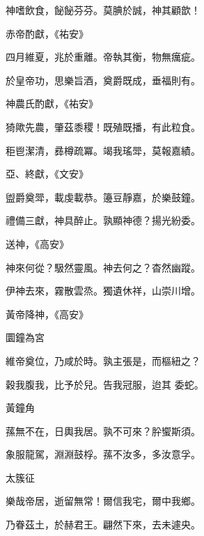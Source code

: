 \begin{pinyinscope}
 神嗜飲食，飶飶芬芬。莫腆於誠，神其顧歆！



 赤帝酌獻，《祐安》



 四月維夏，兆於重離。帝執其衡，物無癘疵。



 於皇帝功，思樂旨酒，奠爵既成，垂福則有。



 神農氏酌獻，《祐安》



 猗歟先農，肇茲黍稷！既殖既播，有此粒食。



 秬鬯潔清，彞樽疏冪。竭我瑤斝，莫報嘉績。



 亞、終獻，《文安》



 盥爵奠斝，載虔載恭。籩豆靜嘉，於樂鼓鐘。



 禮備三獻，神具醉止。孰顯神德？揚光紛委。



 送神，《高安》



 神來何從？馺然靈風。神去何之？杳然幽蹤。



 伊神去來，霧散雲烝。獨遺休祥，山崇川增。



 黃帝降神，《高安》



 圜鐘為宮



 維帝奠位，乃咸於時。孰主張是，而樞紐之？



 穀我腹我，比予於兒。告我冠服，迨其
 委蛇。



 黃鐘角



 蓀無不在，日輿我居。孰不可來？肸蠁斯須。



 象服龍駕，淵淵鼓桴。蓀不汝多，多汝意孚。



 太簇征



 樂哉帝居，逝留無常！爾信我宅，爾中我鄉。



 乃眷茲土，於赫君王。翩然下來，去未遽央。




\end{pinyinscope}
